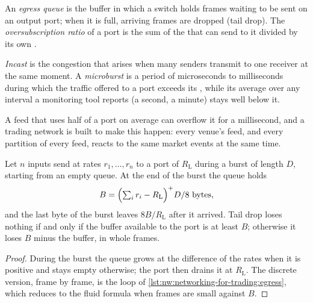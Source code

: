 \begin{definition}\label{def:nw:networking-for-trading:egress}
An \emph{egress queue} is the buffer in which a switch holds frames waiting to be sent on an output port;
when it is full, arriving frames are dropped (tail drop). The \emph{oversubscription ratio} of a
port is the sum of the  that can send to it divided by its own .
\end{definition}

\begin{definition}\label{def:nw:networking-for-trading:burst}
\emph{Incast} is the congestion that arises when many senders transmit to one receiver at the same moment. A
\emph{microburst} is a period of microseconds to milliseconds during which the traffic offered to a port
exceeds its , while its average over any interval a monitoring tool reports (a second, a minute) stays well below
it.
\end{definition}

A feed that uses half of a port on average can overflow it for a millisecond, and a trading network is built to make this
happen: every venue's feed, and every partition of every feed, reacts to the same market events at the same time.

\begin{proposition}\label{prop:nw:networking-for-trading:fluid}
Let $n$ inputs send at rates $r_1, \dots, r_n$ to a port of  $R_{\mathrm L}$ during a burst of length $D$, starting
from an empty queue. At the end of the burst the queue holds
\[
  B = \Bigl(\textstyle\sum_i r_i - R_{\mathrm L}\Bigr)^{+} D / 8 \text{ bytes},
\]
and the last byte of the burst leaves $8B/R_{\mathrm L}$ after it arrived. Tail drop loses nothing if and only if the buffer
available to the port is at least $B$; otherwise it loses $B$ minus the buffer, in whole frames.
\end{proposition}

\begin{proof}
During the burst the queue grows at the difference of the rates when it is positive and stays empty otherwise; the port then
drains it at $R_{\mathrm L}$. The discrete version, frame by frame, is the loop of \cref{lst:nw:networking-for-trading:egress},
which reduces to the fluid formula when frames are small against $B$.
\end{proof}


